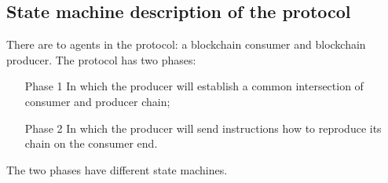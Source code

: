 \documentclass{article}
\theoremstyle{definition}{
  \newtheorem{lemma}{Lemma}[section] %
  \newtheorem{definition}[lemma]{Definition}
}
\theoremstyle{theorem}{
  \newtheorem{invariant}[lemma]{Invariant}
  \newtheorem{proofobligation}[lemma]{Proof Obligation}
}
\numberwithin{equation}{lemma}
\begin{document}
\subsection{State machine description of the protocol}

There are to agents in the protocol: a blockchain consumer and blockchain
producer.  The protocol has two phases:
\begin{itemize}
    \item[Phase 1] In which the producer will establish a common intersection
        of consumer and producer chain;
    \item[Phase 2] In which the producer will send instructions how to
        reproduce its chain on the consumer end.
\end{itemize}
The two phases have different state machines.
\end{document}
